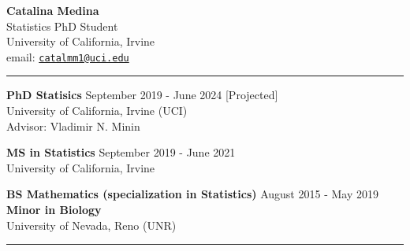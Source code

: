 \documentclass{article}
\makeatletter
\newcommand{\myname}{Catalina Medina}
\newcommand{\myemail}{catalmm1@uci.edu}
\newcommand{\myhomeaddress}{Statistics PhD Student\\ %
	 University of California, Irvine \\ email: \texttt{\href{mailto:\myemail}{\myemail}} %
 }
\makeatother
\begin{document}
\thispagestyle{empty}
\phantom{.}\vspace{-2cm}
\begin{center}
	{\huge \bf \myname}\\
	\myhomeaddress
\end{center}

\vspace{-4mm}
\rule{\linewidth}{1pt}


\begin{description}
	\vspace{-2mm}
	\item[Education]\hspace*{.1in}
	
		\textbf{PhD Statisics} \hfill{September 2019 - June 2024 [Projected]} \\
		University of California, Irvine (UCI)\\ 
		Advisor: Vladimir N. Minin
		\vspace*{1mm}
		
		\textbf{MS in Statistics} \hfill{September 2019 - June 2021}\\
		University of California, Irvine
		\vspace*{1mm}
		
		\textbf{BS Mathematics (specialization in Statistics)} \hfill{August 2015 - May 2019} \\
		\textbf{Minor in Biology}\\
		University of Nevada, Reno (UNR)
		
\end{description}
\vspace{-2mm}
\rule{\linewidth}{1pt}
\end{document}
